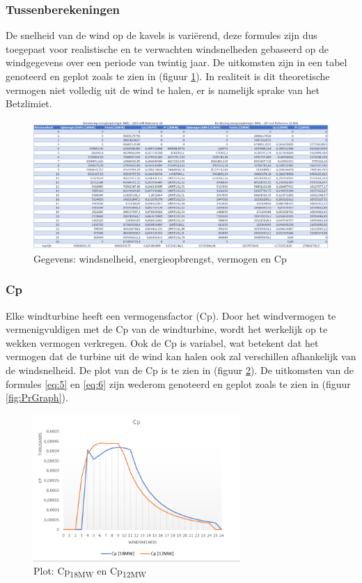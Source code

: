 \subsubsection{Tussenberekeningen}
De snelheid van de wind op de kavels is variërend, deze formules zijn dus toegepast voor realistische en te verwachten windsnelheden gebaseerd op de windgegevens over een periode van twintig jaar.\cite{WindData}
De uitkomsten zijn in een tabel genoteerd en geplot zoals te zien in (figuur \ref{fig:TVUW}). In realiteit is dit theoretische vermogen niet volledig uit de wind te halen, er is namelijk sprake van het Betzlimiet. 

\begin{figure}[H]
\centering
\includegraphics[width=1\textwidth]{IMG/data/overzicht/TVUW.PNG}
\caption{Gegevens: windsnelheid, energieopbrengst, vermogen en Cp}
\label{fig:TVUW}
\end{figure}

\subsubsection{Cp}
Elke windturbine heeft een vermogensfactor (Cp). Door het windvermogen te vermenigvuldigen met de Cp van de windturbine, wordt het werkelijk op te wekken vermogen verkregen. Ook de Cp is variabel, wat betekent dat het vermogen dat de turbine uit de wind kan halen ook zal verschillen afhankelijk van de windsnelheid. De plot van de Cp is te zien in (figuur \ref{fig:CpGraph}). De uitkomsten van de formules \ref{eq:5} en \ref{eq:6} zijn wederom genoteerd en geplot zoals te zien in (figuur \ref{fig:PrGraph}). 
\begin{figure}[H]
\centering
\includegraphics[width=0.7\textwidth]{IMG/data/overzicht/Cp_graph.PNG}
\caption{Plot: Cp\textsubscript{18MW} en Cp\textsubscript{12MW}}
\label{fig:CpGraph}
\end{figure}
